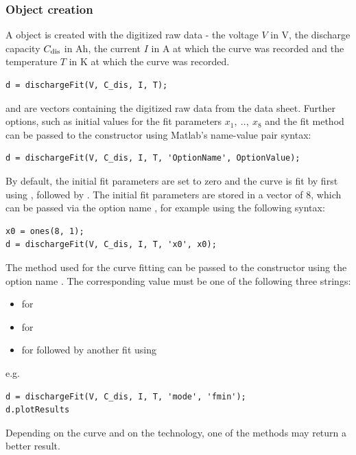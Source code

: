 \subsubsection{Object creation}
A  object is created with the digitized raw data - the voltage $V$ in V, the discharge capacity $C_\text{dis}$ in Ah, the current $I$ in A at which the curve was recorded and the temperature $T$ in K at which the curve was recorded.
\begin{lstlisting}
d = dischargeFit(V, C_dis, I, T);
\end{lstlisting}
 and  are vectors containing the digitized raw data from the data sheet. Further options, such as initial values for the fit parameters $x_1,\ ..,\ x_8$ and the fit method can be passed to the constructor using Matlab's name-value pair syntax:
\begin{lstlisting}
d = dischargeFit(V, C_dis, I, T, 'OptionName', OptionValue);
\end{lstlisting}
By default, the initial fit parameters are set to zero and the curve is fit by first using , followed by . The initial fit parameters are stored in a vector  of  8, which can be passed via the option name , for example using the following syntax:
\begin{lstlisting}
x0 = ones(8, 1);
d = dischargeFit(V, C_dis, I, T, 'x0', x0);
\end{lstlisting}
The method used for the curve fitting can be passed to the constructor using the option name . The corresponding value must be one of the following three strings:
\begin{itemize}
	\item {} for 
	\item {} for 
	\item {} for  followed by another fit using 
\end{itemize}
e.g.
\begin{lstlisting}
d = dischargeFit(V, C_dis, I, T, 'mode', 'fmin');
d.plotResults
\end{lstlisting}
Depending on the curve and on the technology, one of the methods may return a better result.


